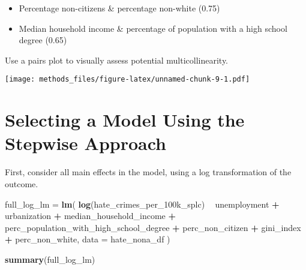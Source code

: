 \documentclass[
]{article}
\newenvironment{Shaded}{\begin{snugshade}}{\end{snugshade}}
\newcommand{\DataTypeTok}[1]{\textcolor[rgb]{0.13,0.29,0.53}{#1}}
\newcommand{\KeywordTok}[1]{\textcolor[rgb]{0.13,0.29,0.53}{\textbf{#1}}}
\newcommand{\NormalTok}[1]{#1}
\newcommand{\OperatorTok}[1]{\textcolor[rgb]{0.81,0.36,0.00}{\textbf{#1}}}
\newcommand{\StringTok}[1]{\textcolor[rgb]{0.31,0.60,0.02}{#1}}
\begin{document}
\begin{itemize}
\item
  Percentage non-citizens \& percentage non-white (0.75)
\item
  Median household income \& percentage of population with a high school
  degree (0.65)
\end{itemize}

Use a pairs plot to visually assess potential multicollinearity.

\begin{Shaded}
\end{Shaded}

\texttt{[image: methods\_files/figure-latex/unnamed-chunk-9-1.pdf]}

\hypertarget{selecting-a-model-using-the-stepwise-approach}{%
\section{Selecting a Model Using the Stepwise
Approach}\label{selecting-a-model-using-the-stepwise-approach}}

First, consider all main effects in the model, using a log
transformation of the outcome.

\begin{Shaded}
\begin{Highlighting}[]
\NormalTok{full_log_lm =}\StringTok{ }\KeywordTok{lm}\NormalTok{(}
  \KeywordTok{log}\NormalTok{(hate_crimes_per_100k_splc)}
  \OperatorTok{~}\StringTok{ }\NormalTok{unemployment }\OperatorTok{+}\StringTok{ }
\StringTok{    }\NormalTok{urbanization }\OperatorTok{+}
\StringTok{    }\NormalTok{median_household_income }\OperatorTok{+}
\StringTok{    }\NormalTok{perc_population_with_high_school_degree }\OperatorTok{+}
\StringTok{    }\NormalTok{perc_non_citizen }\OperatorTok{+}
\StringTok{    }\NormalTok{gini_index }\OperatorTok{+}
\StringTok{    }\NormalTok{perc_non_white,}
  \DataTypeTok{data =}\NormalTok{ hate_nona_df}
\NormalTok{)}

\KeywordTok{summary}\NormalTok{(full_log_lm)}
\end{Highlighting}
\end{Shaded}
\end{document}
